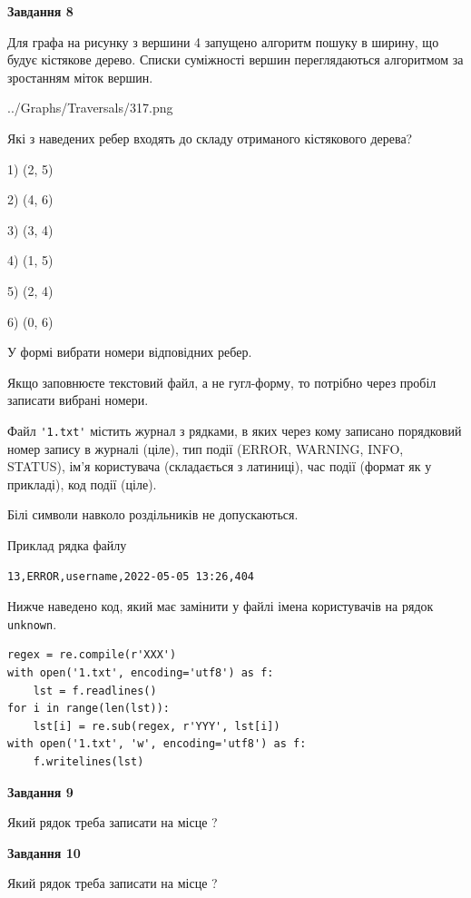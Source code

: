 \documentclass[12pt, ukrainian]{article}
\def\code#1{\Verb!#1!}
\begin{document}
{\begin {large}
{\begin {center}\textbf{Завдання 8}\end {center}}\par
Для графа на рисунку з вершини 4 запущено алгоритм пошуку в ширину, що будує кістякове дерево. Списки суміжності вершин переглядаються алгоритмом за зростанням міток вершин.\par
\begin{center}
	{../Graphs/Traversals/317.png}
\end{center}
\par Які з наведених ребер входять до складу отриманого кістякового дерева?\par
1) (2, 5)\par
2) (4, 6)\par
3) (3, 4)\par
4) (1, 5)\par
5) (2, 4)\par
6) (0, 6)\par
{\vskip 15pt} У формі вибрати номери відповідних ребер.


Якщо заповнюєте текстовий файл, а не гугл-форму, то потрібно через пробіл записа\-ти вибрані номери.\par
\newpage


Файл \code{'1.txt'} містить журнал з рядками, в яких через кому записано поряд\-ко\-вий номер запису в журналі (ціле), тип події (ERROR, WARNING, INFO, STATUS), ім'я користувача (складається з латиниці), час події (фор\-мат як у прикладі), код події (ціле).

Білі символи навколо роздільників не допускаються.

Приклад рядка файлу



\begin{verbatim}
13,ERROR,username,2022-05-05 13:26,404
\end{verbatim}


Нижче наведено код, який має замінити у файлі імена користувачів на рядок \code{unknown}.



\begin{verbatim}
regex = re.compile(r'XXX')
with open('1.txt', encoding='utf8') as f:
    lst = f.readlines()
for i in range(len(lst)):
    lst[i] = re.sub(regex, r'YYY', lst[i])
with open('1.txt', 'w', encoding='utf8') as f:
    f.writelines(lst)
\end{verbatim}




{\begin {center}\textbf{Завдання 9}\end {center}}\par
Який рядок треба записати на місце  ?\par
\vspace{5mm}


{\begin {center}\textbf{Завдання 10}\end {center}}\par
Який рядок треба записати на місце  ?\par


\newpage


\end {large}}
\end{document}
